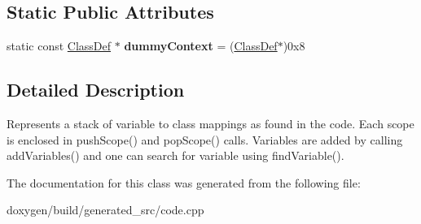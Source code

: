 \subsection*{Static Public Attributes}
\begin{DoxyCompactItemize}
\item 
\mbox{\label{class_variable_context_aeca8de524f06142f5a49a0a8f87467b0}} 
static const \mbox{\hyperlink{class_class_def}{Class\+Def}} $\ast$ {\bfseries dummy\+Context} = (\mbox{\hyperlink{class_class_def}{Class\+Def}}$\ast$)0x8
\end{DoxyCompactItemize}


\subsection{Detailed Description}
Represents a stack of variable to class mappings as found in the code. Each scope is enclosed in push\+Scope() and pop\+Scope() calls. Variables are added by calling add\+Variables() and one can search for variable using find\+Variable(). 

The documentation for this class was generated from the following file\+:\begin{DoxyCompactItemize}
\item 
doxygen/build/generated\+\_\+src/code.\+cpp\end{DoxyCompactItemize}
